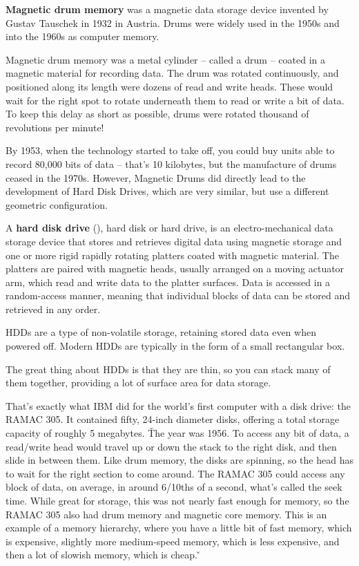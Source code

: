 \textbf{Magnetic drum memory} was a magnetic data storage device invented by Gustav Tauschek in 1932 in Austria.
Drums were widely used in the 1950s and into the 1960s as computer memory.
\ed

Magnetic drum memory was a metal cylinder – called a drum – coated in a magnetic material for recording data. The
drum was rotated continuously, and positioned along its length were dozens of read and write heads. These would wait
for the right spot to rotate underneath them to read or write a bit of data. To keep this delay as short as possible,
drums were rotated thousand of revolutions per minute!


By 1953, when the technology started to take off, you could buy units able to record 80,000 bits of data – that's 10
kilobytes, but the manufacture of drums ceased in the 1970s. However, Magnetic Drums did directly lead to the
development of Hard Disk Drives, which are very similar, but use a different geometric configuration.

A \textbf{hard disk drive} (\textbf{}), hard disk or hard drive, is an electro-mechanical data storage device that
stores and retrieves digital data using magnetic storage and one or more rigid rapidly rotating platters coated with
magnetic material. The platters are paired with magnetic heads, usually arranged on a moving actuator arm, which read
and write data to the platter surfaces. Data is accessed in a random-access manner, meaning that individual blocks of
data can be stored and retrieved in any order.
\ed

HDDs are a type of non-volatile storage, retaining stored data even when powered off. Modern HDDs are typically in
the form of a small rectangular box.


The great thing about HDDs is that they are thin, so you can stack many of them together, providing a lot of surface
area for data storage.

\be
That's exactly what IBM did for the world's first computer with a disk drive: the RAMAC 305. It contained fifty,
24-inch diameter disks, offering a total storage capacity of roughly 5 megabytes. \v

The year was 1956. To access any bit of data, a read/write head would travel up or down the stack to the right disk,
and then slide in between them. Like drum memory, the disks are spinning, so the head has to wait for the right
section to come around. The RAMAC 305 could access any block of data,  on average, in around 6/10ths of a second,
what's called the seek time. While great for storage, this was not nearly fast enough for memory, so the RAMAC 305
also had drum memory and magnetic core memory. This is an example of a memory hierarchy, where you have a little bit
of fast memory, which is expensive, slightly more medium-speed memory, which is less expensive, and then a lot of
slowish memory, which is cheap. \v

